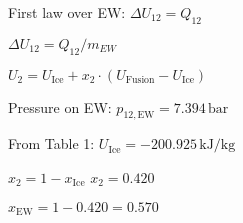 First law over EW:  
\( \Delta U_{12} = Q_{12} \)  

\( \Delta U_{12} = Q_{12} / m_{EW} \)  

\( U_2 = U_{\text{Ice}} + x_2 \cdot (U_{\text{Fusion}} - U_{\text{Ice}}) \)  

Pressure on EW:  
\( p_{12,\text{EW}} = 7.394 \, \text{bar} \)  

From Table 1:  
\( U_{\text{Ice}} = -200.925 \, \text{kJ/kg} \)  

\( x_2 = 1 - x_{\text{Ice}} \)  
\( x_2 = 0.420 \)  

\( x_{\text{EW}} = 1 - 0.420 = 0.570 \)
